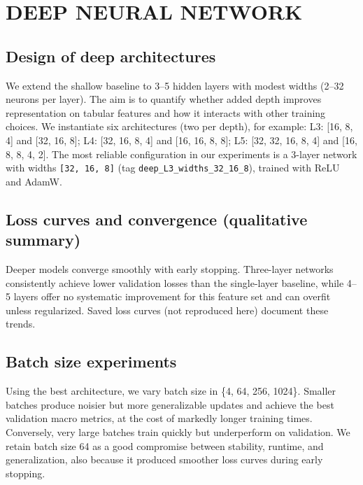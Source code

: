 
\section{DEEP NEURAL NETWORK} \label{sec:deep-nn}

    \subsection{Design of deep architectures}

        We extend the shallow baseline to 3--5 hidden layers with modest widths (2--32 neurons per layer). 
        The aim is to quantify whether added depth improves representation on tabular features and how it interacts with other training choices. 
        We instantiate six architectures (two per depth), for example: L3: [16, 8, 4] and [32, 16, 8]; L4: [32, 16, 8, 4] and [16, 16, 8, 8]; L5: [32, 32, 16, 8, 4] and [16, 8, 8, 4, 2]. 
        The most reliable configuration in our experiments is a 3-layer network with widths \texttt{[32, 16, 8]} (tag \texttt{deep\_L3\_widths\_32\_16\_8}), trained with ReLU and AdamW.

    \subsection{Loss curves and convergence (qualitative summary)}

        Deeper models converge smoothly with early stopping. 
        Three-layer networks consistently achieve lower validation losses than the single-layer baseline, while 4--5 layers offer no systematic improvement for this feature set and can overfit unless regularized. 
        Saved loss curves (not reproduced here) document these trends.

    \subsection{Batch size experiments}
    
        Using the best architecture, we vary batch size in \{4, 64, 256, 1024\}. 
        Smaller batches produce noisier but more generalizable updates and achieve the best validation macro metrics, at the cost of markedly longer training times. 
        Conversely, very large batches train quickly but underperform on validation. 
        We retain batch size 64 as a good compromise between stability, runtime, and generalization, also because it produced smoother loss curves during early stopping.

